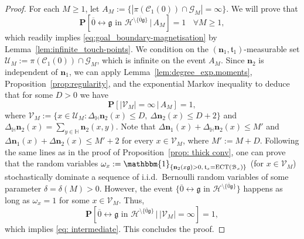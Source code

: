 \documentclass[11pt,a4paper]{article}
\theoremstyle{definition}
\numberwithin{equation}{section}
\newcommand\n{\mathbf{n}}
\newcommand\fg{\mathfrak{g}}
\newcommand\ft{\mathfrak{t}}
\begin{document}
\begin{proof}
For each $M\geq1$, let $A_{M}:=\{|\pi(\mathcal{C}_1(0))\cap \mathcal{G}_{M}|=\infty\}$. We will prove that 
\begin{equation}\label{eq: intermediate}
    \mathbf{P}[\overline{0}\longleftrightarrow \fg \text{ in } \mathcal{H}^{\setminus \{\overline{0}\fg\}} \,|\, A_M]=1 ~~~~\forall M\geq1,
\end{equation}
which readily implies \eqref{eq:goal_boundary-magnetisation} by Lemma~\ref{lem:infinite_touch-points}. We condition on the $(\n_1,\ft_1)$-measurable set $\mathcal{U}_M:=\pi(\mathcal{C}_1(0))\cap \mathcal{G}_{M}$, which is infinite on the event $A_M$.
Since $\n_2$ is independent of $\n_1$, we can apply Lemma~\ref{lem:degree_exp.moments},  Proposition~\ref{prop:regularity}, and the exponential Markov inequality to deduce that for some $D>0$ we have
\begin{equation}
     \mathbf{P}[|\mathcal{V}_M|=\infty \,|\, A_M]=1,
\end{equation}
where $\mathcal{V}_M:=\{x\in \mathcal{U}_M: \Delta_{\mathbb H}\n_2(x)\leq D,~\Delta\n_2(x)\leq D+2\}$ and $\Delta_\mathbb{H}\n_2(x)=\sum_{y\in \mathbb H}\n_2(x,y)$.
Note that $\Delta\n_1(x)+\Delta_{\mathbb H}\n_2(x)\leq M'$ and $\Delta\n_1(x)+\Delta\n_2(x)\leq M'+2$ for every $x\in \mathcal{V}_M$, where $M':=M+D$.
Following the same lines as in the proof of Proposition~\ref{prop: thick conv}, one can prove that the random variables $\omega_x:=\mathbbm{1}_{\{\n_2(x\fg)>0,\, \ft_x=\mathrm{ECT}(\mathcal{B}_x)\}}$ (for $x\in \mathcal{V}_M$) stochastically dominate a sequence of i.i.d.~Bernoulli random variables of some parameter $\delta=\delta(M)>0$.
However, the event $\{\overline{0}\longleftrightarrow \fg \text{ in } \mathcal{H}^{\setminus \{\overline{0}\fg\}}\}$ happens as long as $\omega_x=1$ for some $x\in \mathcal{V}_M$. Thus,
\begin{equation}
    \mathbf{P}[\overline{0}\longleftrightarrow \fg \text{ in } \mathcal{H}^{\setminus \{\overline{0}\fg\}} \,|\, |\mathcal{V}_M|=\infty]=1,
\end{equation}
which implies \eqref{eq: intermediate}. This concludes the proof.
\end{proof}
\end{document}
